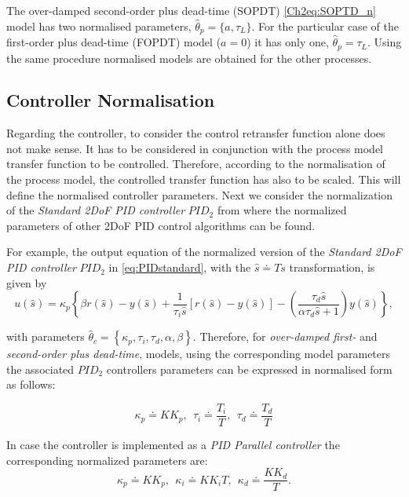 The over-damped second-order plus dead-time (SOPDT) \eqref{Ch2eq:SOPTD_n} model has two normalised parameters, $\hat{\theta}_p = \{a, \tau_L\}$.  For the particular case of the first-order plus dead-time (FOPDT) model ($a=0$) it has only one, $\hat{\theta}_p = \tau_L$. Using the same procedure normalised models are obtained for the other processes.\\


\subsection{Controller Normalisation}
\label{sec:4.2}

Regarding the controller, to consider the control retransfer function alone does not make sense. It has to be considered in conjunction with the process model transfer function to be controlled. Therefore, according to the normalisation of the process model, the controlled transfer function has also to be scaled. This will define the normalised controller parameters. Next we consider the normalization of the \emph{Standard 2DoF PID controller} $PID_2$ from where the normalized parameters of other 2DoF PID control algorithms can be found.

For example, the output equation of the normalized version of the \emph{Standard 2DoF PID controller} $PID_2$ in \eqref{eq:PIDstandard}, with the $\hat s \doteq T s$ transformation, is given by
\begin{equation}
	u(\hat s) = \kappa_p \left\{\beta r(\hat s)-y(\hat s) + \frac{1}{\tau_i \hat s} \left[r(\hat s)-y(\hat s)\right] - \left(\frac{\tau_d \hat s}{\alpha \tau_d \hat s+1}\right) y(\hat s)\right\},
\end{equation}

\noindent with parameters $\hat{\theta}_c = \left\{\kappa_p, \tau_i, \tau_d, \alpha, \beta \right\}$. Therefore,  for \emph{over-damped first-} and \emph{second-order plus dead-time},  models, using the corresponding model parameters the associated $PID_2$ controllers parameters can be expressed in normalised form as follows:

\begin{equation}
	\kappa_p \doteq K K_p, \ \ \tau_i \doteq \frac{T_i}{T}, \ \ \tau_d \doteq \frac{T_d}{T} 
	\label{Ch2eq:PIDNormalized}
\end{equation}

In case the controller is implemented as a \emph{PID Parallel controller} the corresponding normalized parameters are:
\begin{equation}
	\kappa_p \doteq K K_p, \ \ \kappa_i \doteq K K_i T, \ \ \kappa_d \doteq \frac{K K_d}{T}.	
\end{equation}



